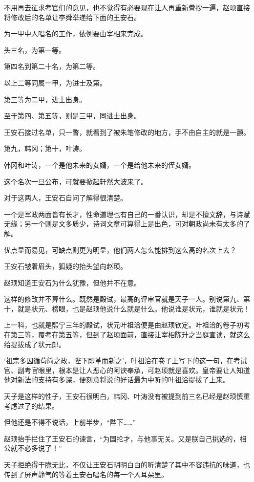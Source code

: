 不用再去征求考官们的意见，也不觉得有必要现在让人再重新誊抄一遍，赵顼直接将修改后的名单让李舜举递给下面的王安石。

为一甲中人唱名的工作，依例要由宰相来完成。

头三名，为第一等。

第四名到第二十名，为第二等。

以上二等同属一甲，为进士及第。

第三等为二甲，进士出身。

至于第四、第五等，则是三甲，同进士出身。

王安石接过名单，只一瞥，就看到了被朱笔修改的地方，手不由自主的就是一颤。

第九，韩冈；第十，叶涛。

韩冈和叶涛，一个是他未来的女婿，一个是给他未来的侄女婿。

这个名次一旦公布，可就要掀起轩然大波来了。

对于这两人，王安石自问了解得很清楚。

一个是军政两面皆有长才，性命道理也有自己的一番认识，却是不擅文辞，与诗赋无缘；另一个则是文多质少，诗词文章可算得上是出色，可对朝政尚未有太多的了解。

优点显而易见，可缺点则更为明显，他们两人怎么能排到这么高的名次上去？

王安石皱着眉头，狐疑的抬头望向赵顼。

赵顼知道王安石为什么犹豫，但他并不在意。

这样的修改并不算什么。既然是殿试，最高的评审官就是天子一人。别说第九、第十，就是状元、榜眼，也是赵顼他说什么就是什么。他说谁是状元，谁就是状元！

上一科，也就是熙宁三年的殿试，状元叶祖洽便是由赵顼钦定。叶祖洽的卷子初考在第三等，覆考在第五等，但到了赵顼面前，直接让宰相陈升之当庭宣读，就这么给提拔成了状元郎。

‘祖宗多因循苟简之政，陛下即革而新之’，叶祖洽在卷子上写下的这一句，在考试官、副考官眼里，根本是让人恶心的阿谀奉承，可赵顼就是喜欢。皇帝要让人知道他对新法的支持有多深，便刻意将说的好话最为中听的叶祖洽提拔了上来。

天子是这样的性子，王安石很明白，韩冈、叶涛没有被提到前三名已经是赵顼慎重考虑过了的结果。

但他还是不得不说话，上前半步，“陛下……”

赵顼抬手拦住了王安石的谏言，“为国抡才，与他事无关。又是朕自己挑选的，相公就不必多说了！”

天子拒绝得干脆无比，不仅让王安石明明白白的听清楚了其中不容违抗的味道，也传到了屏声静气的等着王安石唱名的每一个人耳朵里。

